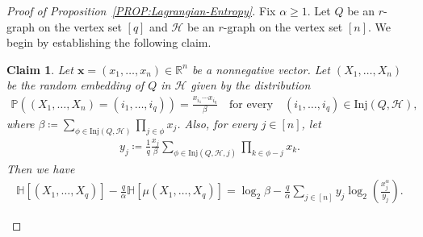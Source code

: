\documentclass[11pt,a4paper]{article}
\newtheorem{claim}[definition]{Claim}
\begin{document}
\begin{proof}[Proof of Proposition~\ref{PROP:Lagrangian-Entropy}]
    Fix $\alpha \ge 1$. 
    Let $Q$ be an $r$-graph on the vertex set $[q]$ and $\mathcal{H}$ be an $r$-graph on the vertex set $[n]$. 
    We begin by establishing the following claim.

    \begin{claim}\label{CLAIM:entropy-difference-simplify}
        Let $\mathbf{x} = (x_1, \ldots, x_n) \in \mathbb{R}^{n}$ be a nonnegative vector. 
        Let $(X_1, \ldots, X_n)$ be the random embedding of $Q$ in $\mathcal{H}$ given by the distribution
        \begin{align}\label{equ:random-Q-prob-def}
            \mathbb{P}\left((X_1, \ldots, X_n) = (i_1, \ldots, i_q)\right)
            = \frac{x_{i_1} \cdots x_{i_q}}{\beta}
            \quad\text{for every}\quad (i_1, \ldots, i_q) \in \mathrm{Inj}(Q,\mathcal{H}), 
        \end{align}
        where $\beta \coloneqq \sum_{\phi \in \mathrm{Inj}(Q,\mathcal{H})} \prod_{j \in \phi} x_j$. 
        Also, for every $j \in [n]$, let 
        \begin{align}
            y_j 
            \coloneqq \frac{1}{q} \frac{x_j}{\beta} \sum_{\phi \in \mathrm{Inj}(Q,\mathcal{H}, j)} \prod_{k\in \phi - j} x_k. \label{equ:random-yj-prob-def}
        \end{align}
        Then we have 
        \begin{align*}
            \mathbb{H}[(X_1, \ldots, X_{q})] - \frac{q}{\alpha} \mathbb{H}[\mu(X_1, \ldots, X_q)] 
            = \log_{2} \beta - \frac{q}{\alpha} \sum_{j \in [n]} y_j \log_{2}\left(\frac{x_j^{\alpha}}{y_j}\right). 

\end{align*}
\end{claim}
\end{proof}
\end{document}
